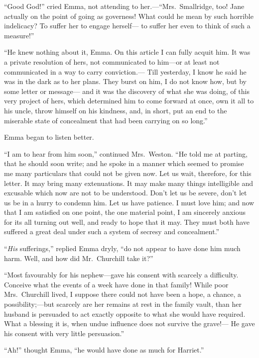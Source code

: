 ``Good God!'' cried Emma, not attending to her.---``Mrs.\ Smallridge, too!
Jane actually on the point of going as governess!  What could he
mean by such horrible indelicacy?  To suffer her to engage herself---%
to suffer her even to think of such a measure!''

``He knew nothing about it, Emma.  On this article I can fully
acquit him.  It was a private resolution of hers, not communicated
to him---or at least not communicated in a way to carry conviction.---%
Till yesterday, I know he said he was in the dark as to her plans.
They burst on him, I do not know how, but by some letter or message---%
and it was the discovery of what she was doing, of this very project
of hers, which determined him to come forward at once, own it
all to his uncle, throw himself on his kindness, and, in short,
put an end to the miserable state of concealment that had been
carrying on so long.''

Emma began to listen better.

``I am to hear from him soon,'' continued Mrs.\ Weston.  ``He told me
at parting, that he should soon write; and he spoke in a manner which
seemed to promise me many particulars that could not be given now.
Let us wait, therefore, for this letter.  It may bring many extenuations.
It may make many things intelligible and excusable which now are
not to be understood.  Don't let us be severe, don't let us be in
a hurry to condemn him.  Let us have patience.  I must love him;
and now that I am satisfied on one point, the one material point,
I am sincerely anxious for its all turning out well, and ready
to hope that it may.  They must both have suffered a great deal
under such a system of secresy and concealment.''

``\emph{His} sufferings,'' replied Emma dryly, ``do not appear to have done
him much harm.  Well, and how did Mr.\ Churchill take it?''

``Most favourably for his nephew---gave his consent with scarcely
a difficulty.  Conceive what the events of a week have done
in that family!  While poor Mrs.\ Churchill lived, I suppose there
could not have been a hope, a chance, a possibility;---but scarcely
are her remains at rest in the family vault, than her husband is
persuaded to act exactly opposite to what she would have required.
What a blessing it is, when undue influence does not survive the grave!---%
He gave his consent with very little persuasion.''

``Ah!'' thought Emma, ``he would have done as much for Harriet.''

